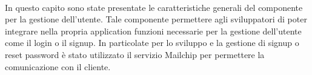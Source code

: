 \paragraph{}
In questo capito sono state presentate le caratteristiche generali del componente per la gestione dell'utente.
Tale componente permettere agli sviluppatori di poter integrare nella propria application funzioni necessarie per la gestione dell'utente come il login o il signup.
In particolate per lo sviluppo e la gestione di signup o reset password è stato utilizzato il servizio Mailchip per permettere la comunicazione con il cliente.
